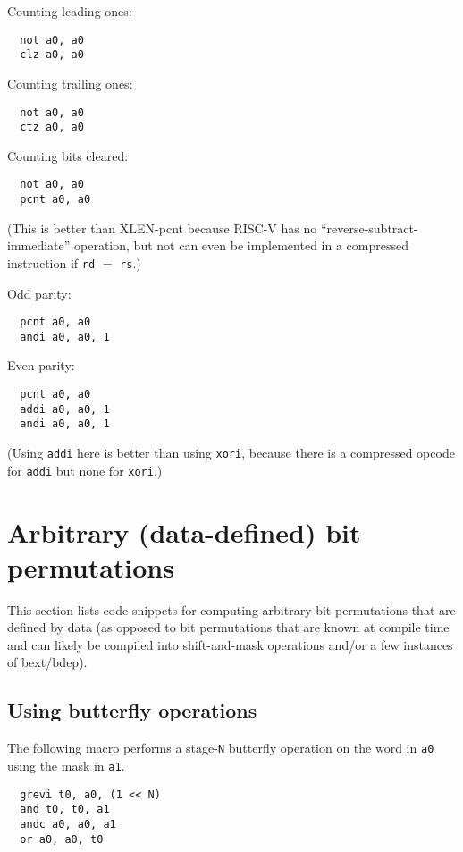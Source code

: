 Counting leading ones:

\begin{verbatim}
  not a0, a0
  clz a0, a0
\end{verbatim}

Counting trailing ones:

\begin{verbatim}
  not a0, a0
  ctz a0, a0
\end{verbatim}

Counting bits cleared:

\begin{verbatim}
  not a0, a0
  pcnt a0, a0
\end{verbatim}

(This is better than XLEN-pcnt because RISC-V has no ``reverse-subtract-immediate'' operation, but not
can even be implemented in a compressed instruction if {\tt rd} $=$ {\tt rs}.)

Odd parity:

\begin{verbatim}
  pcnt a0, a0
  andi a0, a0, 1
\end{verbatim}

Even parity:

\begin{verbatim}
  pcnt a0, a0
  addi a0, a0, 1
  andi a0, a0, 1
\end{verbatim}

(Using {\tt addi} here is better than using {\tt xori}, because there is
a compressed opcode for {\tt addi} but none for {\tt xori}.)

\section{Arbitrary (data-defined) bit permutations}

This section lists code snippets for computing arbitrary bit permutations that
are defined by data (as opposed to bit permutations that are known at compile
time and can likely be compiled into shift-and-mask operations and/or a few
instances of bext/bdep).

\subsection{Using butterfly operations}

The following macro performs a stage-{\tt N} butterfly operation on the word in
{\tt a0} using the mask in {\tt a1}.

\begin{verbatim}
  grevi t0, a0, (1 << N)
  and t0, t0, a1
  andc a0, a0, a1
  or a0, a0, t0
\end{verbatim}

